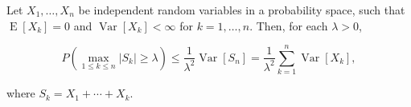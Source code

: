\documentclass[12pt]{article}
\begin{document}
Let $X_1,\dots, X_n$ be independent random variables in a probability space, such that $\operatorname{E}[X_k]=0$ and $\operatorname{Var}[X_k] <\infty$ for 
$k=1,\dots, n$. Then, for each $\lambda>0$, 

\[P\left(\max_{1\leq k\leq n} |S_k|\geq\lambda\right)\leq \frac{1}{\lambda^2}\operatorname{Var}[S_n] = \frac{1}{\lambda^2}\sum_{k=1}^n \operatorname{Var}[X_k], \]

where $S_k = X_1 +\cdots + X_k$.
\end{document}
